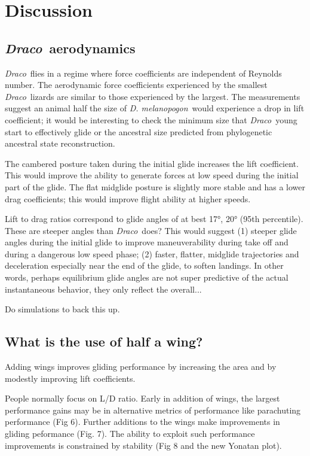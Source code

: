\documentclass[10pt]{article}
\newcommand{\Draco}{\emph{Draco}}
\newcommand{\Dmelanopogon}{\emph{D. melanopogon}}
\begin{document}
\section{Discussion}

\subsection{\Draco\ aerodynamics}
\Draco\ flies in a regime where force coefficients are independent of Reynolds number. The aerodynamic force coefficients experienced by the smallest \Draco\ lizards are similar to those experienced by the largest. The measurements suggest an animal half the size of \Dmelanopogon\ would experience a drop in lift coefficient; it would be interesting to check the minimum size that \Draco\ young start to effectively glide or the ancestral size predicted from phylogenetic ancestral state reconstruction. 

The cambered posture taken during the initial glide increases the lift coefficient.  This would improve the ability to generate forces at low speed during the initial part of the glide.  The flat midglide posture is slightly more stable and has a lower drag coefficients; this would improve flight ability at higher speeds.  

Lift to drag ratios correspond to glide angles of at best \ang{17}, \ang{20} (95th percentile).  These are steeper angles than \Draco\ does?  This would suggest (1) steeper glide angles during the initial glide to improve maneuverability during take off and during a dangerous low speed phase; (2) faster, flatter, midglide trajectories and deceleration especially near the end of the glide, to soften landings.  In other words, perhaps equilibrium glide angles are not super predictive of the actual instantaneous behavior, they only reflect the overall... 

Do simulations to back this up. 

\subsection{What is the use of half a wing?}
Adding wings improves gliding performance by increasing the area and by modestly improving lift coefficients. 

People normally focus on L/D ratio.  Early in addition of wings, the largest performance gains may be in alternative metrics of performance like parachuting performance (Fig 6).  Further additions to the wings make improvements in gliding peformance (Fig. 7).  The ability to exploit such performance improvements is constrained by stability (Fig 8 and the new Yonatan plot).  
\end{document}

